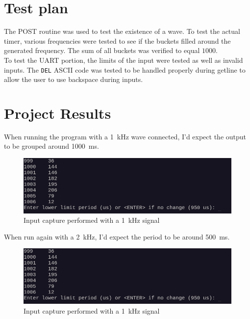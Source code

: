 \documentclass[CMPE]{KGCOEReport}
\def\code#1{\texttt{#1}}
\begin{document}
    \section*{Test plan}

    The POST routine was used to test the existence of a wave. To test the actual timer,
    various frequencies were tested to see if the buckets filled around the generated
    frequency. The sum of all buckets was verified to equal $1000$.\\

    To test the UART portion, the limits of the input were tested as well as invalid
    inputs. The \code{DEL} ASCII code was tested to be handled properly during getline
    to allow the user to use backspace during inputs.

    \section*{Project Results}

    When running the program with a \SI{1}{\kilo\Hz} wave connected, I'd expect the
    output to be grouped around \SI{1000}{ms}.
    
    \begin{figure}[h!]
    \includegraphics[width=\textwidth]{s1}
    \caption{Input capture performed with a \SI{1}{\kilo\Hz} signal}
    \end{figure}

    When run again with a \SI{2}{\kilo\Hz}, I'd expect the period to be around
    \SI{500}{ms}.

    \begin{figure}[h!]
    \includegraphics[width=\textwidth]{s1}
    \caption{Input capture performed with a \SI{1}{\kilo\Hz} signal}
    \end{figure}
\end{document}
